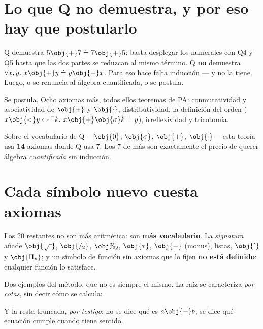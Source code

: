 \section{Lo que Q no demuestra, y por eso hay que postularlo}

\begin{leccion}
Q demuestra \(5\obj{+}7 \doteq 7\obj{+}5\): basta desplegar los numerales con Q4 y Q5 hasta que las
dos partes se reduzcan al mismo término. Q \textbf{no} demuestra
\(\forall x,y.\ x\obj{+}y \doteq y\obj{+}x\). Para eso hace falta inducción — y  no
la tiene. Luego, o se renuncia al álgebra cuantificada, o se postula.
\end{leccion}

Se postula. Ocho axiomas más, todos ellos teoremas de PA: conmutatividad y asociatividad de
\(\obj{+}\) y \(\obj{\cdot}\), distributividad, la definición del orden
(\(x \obj{<} y \Leftrightarrow \exists k.\ x \obj{+} \obj{\sigma}k \doteq y\)), irreflexividad y
tricotomía.


\begin{matematica}
Sobre el vocabulario de Q —\(\obj{0}\), \(\obj{\sigma}\), \(\obj{+}\), \(\obj{\cdot}\)— esta teoría
usa \textbf{14} axiomas donde Q usa 7. Los 7 de más son exactamente el precio de querer álgebra
\emph{cuantificada} sin inducción.
\end{matematica}

\section{Cada símbolo nuevo cuesta axiomas}

Los 20 restantes no son más aritmética: son \textbf{más vocabulario}. La \emph{signatura} añade
\(\obj{\sqrt{\ }}\), \(\obj{/_2}\), \(\obj{\%_2}\), \(\obj{\tau}\), \(\obj{-}\) (monus), listas,
\(\obj{\hat{\ }}\) y \(\obj{\Pi_p}\); y un símbolo de función sin axiomas que lo fijen \textbf{no
está definido}: cualquier función lo satisface.

Dos ejemplos del método, que no es siempre el mismo. La raíz se caracteriza \emph{por cotas}, sin
decir cómo se calcula:


Y la resta truncada, \emph{por testigo}: no se dice qué es \(a \obj{-} b\), se dice qué ecuación
cumple cuando tiene sentido.


